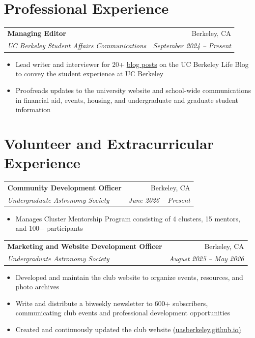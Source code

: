 \documentclass[a4paper,12pt]{article}
\makeatletter
\newenvironment{experience}[4]
    {
    \begin{tabularx}{\linewidth}{@{}X r@{}}
    \textbf{#1} & #3 \\
    \textit{#2} & \textit{#4} \\[-1pt]
    \end{tabularx}
    \begin{minipage}[t]{\linewidth}
    \begin{itemize}[nosep,after=\strut,leftmargin=1em,itemsep=3pt,label=\textopenbullet]
    }
    {
    \end{itemize}
    \end{minipage}
    }
\makeatother
\begin{document}

\section{Professional Experience}

\begin{experience}
{Managing Editor}
{UC Berkeley Student Affairs Communications}
{Berkeley, CA}
{September 2024 -- Present}

\item Lead writer and interviewer for 20+ \href{https://life.berkeley.edu/author/milana/}{blog posts} on the UC Berkeley Life Blog to convey the student experience at UC Berkeley

\item Proofreads updates to the university website and school-wide communications in financial aid, events, housing, and undergraduate and graduate student information

\end{experience}


\section{Volunteer and Extracurricular Experience}

\begin{experience}
{Community Development Officer}
{Undergraduate Astronomy Society}
{Berkeley, CA}
{June 2026 -- Present}

\item Manages Cluster Mentorship Program consisting of 4 clusters, 15 mentors, and 100+ participants

\end{experience}


\begin{experience}
{Marketing and Website Development Officer}
{Undergraduate Astronomy Society}
{Berkeley, CA}
{August 2025 -- May 2026}

\item Developed and maintain the club website to organize events, resources, and photo archives

\item Write and distribute a biweekly newsletter to 600+ subscribers, communicating club events and professional development opportunities

\item Created and continuously updated the club website \href{https://uasberkeley.github.io}{(uasberkeley.github.io)}

\end{experience}
\end{document}
